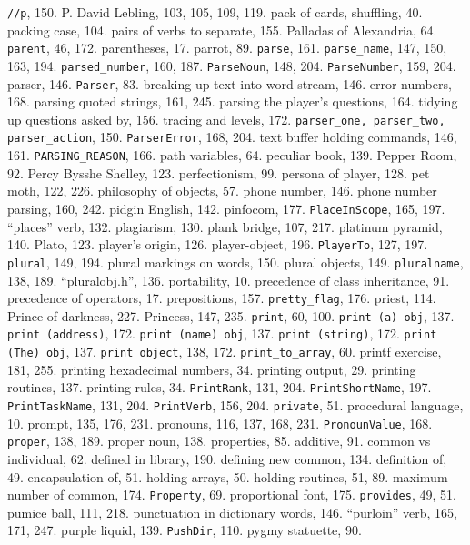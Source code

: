 {{\tt //p}}, 150.
P. David Lebling, 103, 105, 109, 119.
pack of cards, shuffling, 40.
packing case, 104.
pairs of verbs to separate, 155.
Palladas of Alexandria, 64.
{{\tt parent}}, 46, 172.
parentheses, 17.
parrot, 89.
{{\tt parse}}, 161.
{{\tt parse\_name}}, 147, 150, 163, 194.
{{\tt parsed\_number}}, 160, 187.
{{\tt ParseNoun}}, 148, 204.
{{\tt ParseNumber}}, 159, 204.
parser, 146.
{{\tt Parser}}, 83.
\quad  breaking up text into word stream, 146.
\quad  error numbers, 168.
\quad  parsing quoted strings, 161, 245.
\quad  parsing the player's questions, 164.
\quad  tidying up questions asked by, 156.
\quad  tracing and levels, 172.
{{\tt parser\_one, parser\_two, parser\_action}}, 150.
{{\tt ParserError}}, 168, 204.
\quad  text buffer holding commands, 146, 161.
{{\tt PARSING\_REASON}}, 166.
path variables, 64.
peculiar book, 139.
Pepper Room, 92.
Percy Bysshe Shelley, 123.
perfectionism, 99.
persona of player, 128.
pet moth, 122, 226.
philosophy of objects, 57.
phone number, 146.
phone number parsing, 160, 242.
pidgin English, 142.
pinfocom, 177.
{{\tt PlaceInScope}}, 165, 197.
``places'' verb, 132.
plagiarism, 130.
plank bridge, 107, 217.
platinum pyramid, 140.
Plato, 123.
player's origin, 126.
player-object, 196.
{{\tt PlayerTo}}, 127, 197.
{{\tt plural}}, 149, 194.
plural markings on words, 150.
plural objects, 149.
{{\tt pluralname}}, 138, 189.
``pluralobj.h'', 136.
portability, 10.
precedence of class inheritance, 91.
precedence of operators, 17.
prepositions, 157.
{{\tt pretty\_flag}}, 176.
priest, 114.
Prince of darkness, 227.
Princess, 147, 235.
{{\tt print}}, 60, 100.
{{\tt print (a) obj}}, 137.
{{\tt print (address)}}, 172.
{{\tt print (name) obj}}, 137.
{{\tt print (string)}}, 172.
{{\tt print (The) obj}}, 137.
{{\tt print object}}, 138, 172.
{{\tt print\_to\_array}}, 60.
printf exercise, 181, 255.
printing hexadecimal numbers, 34.
printing output, 29.
printing routines, 137.
printing rules, 34.
{{\tt PrintRank}}, 131, 204.
{{\tt PrintShortName}}, 197.
{{\tt PrintTaskName}}, 131, 204.
{{\tt PrintVerb}}, 156, 204.
{{\tt private}}, 51.
procedural language, 10.
prompt, 135, 176, 231.
pronouns, 116, 137, 168, 231.
{{\tt PronounValue}}, 168.
{{\tt proper}}, 138, 189.
proper noun, 138.
properties, 85.
\quad  additive, 91.
\quad  common vs individual, 62.
\quad  defined in library, 190.
\quad  defining new common, 134.
\quad  definition of, 49.
\quad  encapsulation of, 51.
\quad  holding arrays, 50.
\quad  holding routines, 51, 89.
\quad  maximum number of common, 174.
{{\tt Property}}, 69.
proportional font, 175.
{{\tt provides}}, 49, 51.
pumice ball, 111, 218.
punctuation in dictionary words, 146.
``purloin'' verb, 165, 171, 247.
purple liquid, 139.
{{\tt PushDir}}, 110.
pygmy statuette, 90.

